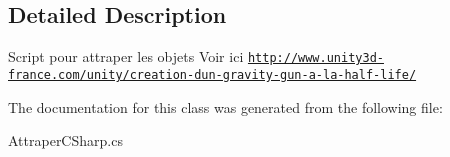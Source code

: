 \subsection{Detailed Description}
Script pour attraper les objets Voir ici \href{http://www.unity3d-france.com/unity/creation-dun-gravity-gun-a-la-half-life/}{\tt http\+://www.\+unity3d-\/france.\+com/unity/creation-\/dun-\/gravity-\/gun-\/a-\/la-\/half-\/life/} 



The documentation for this class was generated from the following file\+:\begin{DoxyCompactItemize}
\item 
Attraper\+C\+Sharp.\+cs\end{DoxyCompactItemize}
